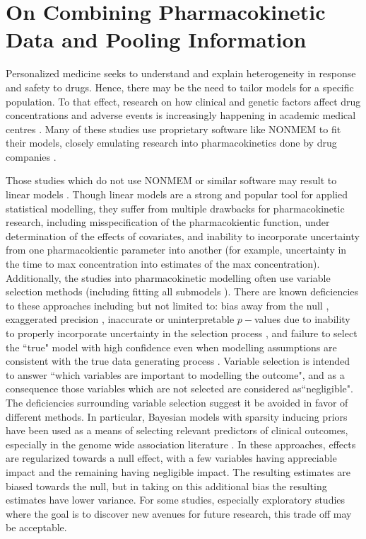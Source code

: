 \section{On Combining Pharmacokinetic Data and Pooling Information}

Personalized medicine seeks to understand and explain heterogeneity in response and safety to drugs.  Hence, there may be the need to tailor models for a specific population.  To that effect, research on how clinical and genetic factors affect drug concentrations and adverse events is increasingly happening in academic medical centres  \cite{gibert_development_2022, gulilat_association_2022, peretz_pharmacokinetics_2021, gulilat_drug_2020, sturkenboom_population_2021}.  Many of these studies use proprietary software like NONMEM \cite{bauer2011nonmem} to fit their models, closely emulating research into pharmacokinetics done by drug companies \cite{cirincione2018population,ueshima2018population}.  

Those studies which do not use NONMEM or similar software may result to linear models \cite{gulilat2020drug}.  Though linear models are a strong and popular tool for applied statistical modelling, they suffer from multiple drawbacks for pharmacokinetic research, including misspecification of the pharmacokientic function, under determination of the effects of covariates, and inability to incorporate uncertainty from one pharmacokientic parameter into another (for example, uncertainty in the time to max concentration into estimates of the max concentration).  Additionally, the studies into pharmacokinetic modelling often use variable selection methods (including fitting all submodels \cite{cirincione2018population,ueshima2018population}).  There are known deficiencies to these approaches including but not limited to: bias away from the null \cite{whittingham2006we}, exaggerated precision \cite{altman1989bootstrap}, inaccurate or uninterpretable $p-$values due to inability to properly incorporate uncertainty in the selection process \cite{harrell2015regression}, and failure to select the ``true" model with high confidence even when modelling assumptions are consistent with the true data generating process \cite{smith2018step}.  Variable selection is intended to answer ``which variables are important to modelling the outcome", and as a consequence those variables which are not selected are considered as``negligible".  The deficiencies surrounding variable selection suggest it be avoided in favor of different methods.  In particular, Bayesian models with sparsity inducing priors have been used as a means of selecting relevant predictors of clinical outcomes, especially in the genome wide association literature \cite{ni2019bayesian, armero2019two, zhou2013polygenic}.  In these approaches, effects are regularized towards a null effect, with a few variables having appreciable impact and the remaining having negligible impact. The resulting estimates are biased towards the null, but in taking on this additional bias the resulting estimates have lower variance.  For some studies, especially exploratory studies where the goal is to discover new avenues for future research, this trade off may be acceptable.

